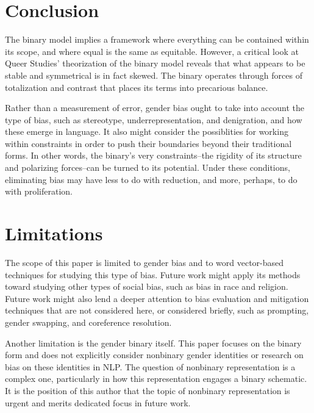 \documentclass[11pt]{article}
\begin{document}
\section{Conclusion}

The binary model implies a framework where everything can be contained
within its scope, and where equal is the same as equitable. However, a
critical look at Queer Studies' theorization of the binary model
reveals that what appears to be stable and symmetrical is in fact
skewed. The binary operates through forces of totalization and
contrast that places its terms into precarious balance.

Rather than a measurement of error, gender bias ought to take into
account the type of bias, such as stereotype, underrepresentation, and
denigration, and how these emerge in language. It also might consider
the possiblities for working within constraints in order to push their
boundaries beyond their traditional forms. In other words, the
binary's very constraints--the rigidity of its structure and
polarizing forces--can be turned to its potential. Under these
conditions, eliminating bias may have less to do with reduction, and
more, perhaps, to do with proliferation.

\section*{Limitations}

The scope of this paper is limited to gender bias and to word
vector-based techniques for studying this type of bias. Future work
might apply its methods toward studying other types of social bias,
such as bias in race and religion. Future work might also lend a
deeper attention to bias evaluation and mitigation techniques that are
not considered here, or considered briefly, such as prompting, gender
swapping, and coreference resolution.

Another limitation is the gender binary itself. This paper focuses on
the binary form and does not explicitly consider nonbinary gender
identities or research on bias on these identities in NLP. The
question of nonbinary representation is a complex one, particularly in
how this representation engages a binary schematic. It is the position
of this author that the topic of nonbinary representation is urgent
and merits dedicated focus in future work.


\end{document}
